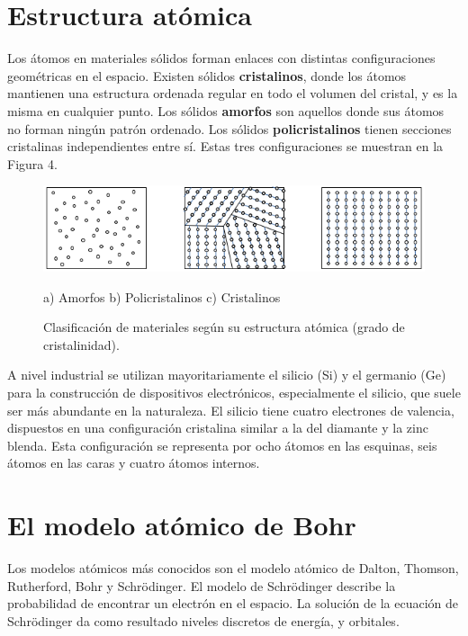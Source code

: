 \section{Estructura atómica}

Los átomos en materiales sólidos forman enlaces con distintas configuraciones geométricas en el espacio. Existen sólidos \textbf{cristalinos}, donde los átomos mantienen una estructura ordenada regular en todo el volumen del cristal, y es la misma en cualquier punto. Los sólidos \textbf{amorfos} son aquellos donde sus átomos no forman ningún patrón ordenado. Los sólidos \textbf{policristalinos} tienen secciones cristalinas independientes entre sí. Estas tres configuraciones se muestran en la Figura 4.

\begin{figure}[H]
    \centering
    \includegraphics{figuras/cristalinidad.png}
    
    a) Amorfos \hspace{2.5cm} b) Policristalinos \hspace{2.5cm} c) Cristalinos
    
    \caption{Clasificación de materiales según su estructura atómica (grado de cristalinidad).}
    \label{cristalinidad}
\end{figure}

A nivel industrial se utilizan mayoritariamente el silicio (Si) y el germanio (Ge) para la construcción de dispositivos electrónicos, especialmente el silicio, que suele ser más abundante en la naturaleza. El silicio tiene cuatro electrones de valencia, dispuestos en una configuración cristalina similar a la del diamante y la zinc blenda. Esta configuración se representa por ocho átomos en las esquinas, seis átomos en las caras y cuatro átomos internos.

\section{El modelo atómico de Bohr}

Los modelos atómicos más conocidos son el modelo atómico de Dalton, Thomson, Rutherford, Bohr y Schrödinger. El modelo de Schrödinger describe la probabilidad de encontrar un electrón en el espacio. La solución de la ecuación de Schrödinger da como resultado niveles discretos de energía, y orbitales. 

